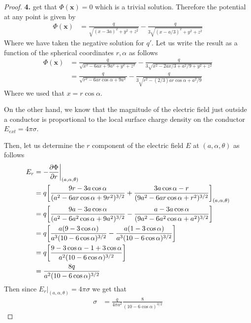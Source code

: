 \documentclass[11pt]{article}
\theoremstyle{definition}
\begin{document}
\begin{proof}{\textbf{4.}}
    get that $\Phi(\bm{x}) = 0$ which is a trivial solution.
    Therefore the potential at any point is given by
    \begin{align*}
        \Phi(\bm{x}) &= \frac{q}{\sqrt{(x-3a)^2 + y^2 + z^2}}
        - \frac{q}{3\sqrt{(x-a/3)^2 + y^2 + z^2}}
    \end{align*}
    Where we have taken the negative solution for $q'$.
    Let us write the result as a function of the spherical coordinates
    $r, \alpha$ as follows
    \begin{align*}
        \Phi(\bm{x}) &= \frac{q}{\sqrt{x^2 - 6ax + 9a^2 + y^2 + z^2}}
        - \frac{q}{3\sqrt{x^2 -2ax/3 + a^2/9 + y^2 + z^2}}\\
        &= \frac{q}{\sqrt{r^2 - 6ar\cos\alpha + 9a^2}}
        - \frac{q}{3\sqrt{r^2 -(2/3)ar\cos\alpha + a^2/9}}
    \end{align*}
    Where we used that $x = r\cos\alpha$.

    On the other hand, we know that the magnitude of the electric field just
    outside a conductor is proportional to the local surface charge density 
    on the conductor $E_{ext} = 4\pi \sigma$.

    Then, let us determine the $r$ component of the electric field $E$ at
    $(a, \alpha, \theta)$ as follows
    \begin{align*}
        E_r &= -\pdv{\Phi}{r}\bigg|_{(a, \alpha, \theta)}\\
        &= q\bigg[
            \frac{9r - 3a\cos\alpha}{(a^2 - 6ar\cos\alpha + 9r^2)^{3/2}}
            + \frac{3a\cos\alpha - r}{(9a^2 - 6ar\cos\alpha + r^2)^{3/2}}
        \bigg]_{(a, \alpha, \theta)}\\
        &= q\bigg[
            \frac{9a - 3a\cos\alpha}{(a^2 - 6a^2\cos\alpha + 9a^2)^{3/2}}
            - \frac{a - 3a\cos\alpha}{(9a^2 - 6a^2\cos\alpha + a^2)^{3/2}}
        \bigg]\\
        &= q\bigg[
            \frac{a(9 - 3\cos\alpha)}{a^3(10 - 6\cos\alpha)^{3/2}}
            - \frac{a(1 - 3\cos\alpha)}{a^3(10 - 6\cos\alpha)^{3/2}}
        \bigg]\\
        &= q\bigg[
            \frac{9 - 3\cos\alpha - 1 + 3\cos\alpha}{a^2(10 - 6\cos\alpha)^{3/2}}
        \bigg]\\
        &= \frac{8q}{a^2(10 - 6\cos\alpha)^{3/2}}
    \end{align*}
    Then since $E_r|_{(a, \alpha, \theta)} = 4\pi \sigma$ we get that
    \begin{align*}
        \sigma &= \frac{q}{4\pi a^2}\frac{8}{(10 - 6\cos\alpha)^{3/2}}
    \end{align*}    
\end{proof}
\end{document}
